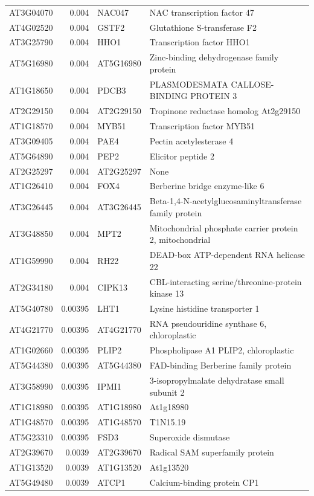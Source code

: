 \documentclass[11pt]{article}
\begin{document}
\begin{center}
\begin{tabular}{lrll}
AT3G04070 & 0.004 & NAC047 & NAC transcription factor 47\\
AT4G02520 & 0.004 & GSTF2 & Glutathione S-transferase F2\\
AT3G25790 & 0.004 & HHO1 & Transcription factor HHO1\\
AT5G16980 & 0.004 & AT5G16980 & Zinc-binding dehydrogenase family protein\\
AT1G18650 & 0.004 & PDCB3 & PLASMODESMATA CALLOSE-BINDING PROTEIN 3\\
AT2G29150 & 0.004 & AT2G29150 & Tropinone reductase homolog At2g29150\\
AT1G18570 & 0.004 & MYB51 & Transcription factor MYB51\\
AT3G09405 & 0.004 & PAE4 & Pectin acetylesterase 4\\
AT5G64890 & 0.004 & PEP2 & Elicitor peptide 2\\
AT2G25297 & 0.004 & AT2G25297 & None\\
AT1G26410 & 0.004 & FOX4 & Berberine bridge enzyme-like 6\\
AT3G26445 & 0.004 & AT3G26445 & Beta-1,4-N-acetylglucosaminyltransferase family protein\\
AT3G48850 & 0.004 & MPT2 & Mitochondrial phosphate carrier protein 2, mitochondrial\\
AT1G59990 & 0.004 & RH22 & DEAD-box ATP-dependent RNA helicase 22\\
AT2G34180 & 0.004 & CIPK13 & CBL-interacting serine/threonine-protein kinase 13\\
AT5G40780 & 0.00395 & LHT1 & Lysine histidine transporter 1\\
AT4G21770 & 0.00395 & AT4G21770 & RNA pseudouridine synthase 6, chloroplastic\\
AT1G02660 & 0.00395 & PLIP2 & Phospholipase A1 PLIP2, chloroplastic\\
AT5G44380 & 0.00395 & AT5G44380 & FAD-binding Berberine family protein\\
AT3G58990 & 0.00395 & IPMI1 & 3-isopropylmalate dehydratase small subunit 2\\
AT1G18980 & 0.00395 & AT1G18980 & At1g18980\\
AT1G48570 & 0.00395 & AT1G48570 & T1N15.19\\
AT5G23310 & 0.00395 & FSD3 & Superoxide dismutase\\
AT2G39670 & 0.0039 & AT2G39670 & Radical SAM superfamily protein\\
AT1G13520 & 0.0039 & AT1G13520 & At1g13520\\
AT5G49480 & 0.0039 & ATCP1 & Calcium-binding protein CP1\\

\end{tabular}
\end{center}
\end{document}
